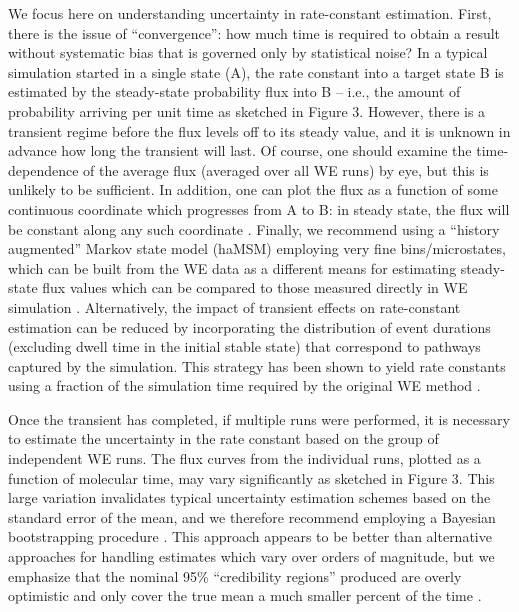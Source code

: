 \documentclass[9pt,tutorial,ASAPversion]{livecoms}
\begin{document}
We focus here on understanding uncertainty in rate-constant estimation. 
First, there is the issue of “convergence”: how much time is required to obtain a result without systematic bias that is governed only by statistical noise? 
In a typical simulation started in a single state (A), the rate constant into a target state B is estimated by the steady-state probability flux into B -- i.e., the amount of probability arriving per unit time as sketched in Figure 3. 
However, there is a transient regime before the flux levels off to its steady value, and it is unknown in advance how long the transient will last. 
Of course, one should examine the time-dependence of the average flux (averaged over all WE runs) by eye, but this is unlikely to be sufficient. 
In addition, one can plot the flux as a function of some continuous coordinate which progresses from A to B: in steady state, the flux will be constant along any such coordinate \citep{Jeremy2019}.
Finally, we recommend using a “history augmented” Markov state model (haMSM) employing very fine bins/microstates, which can be built from the WE data as a different means for estimating steady-state flux values which can be compared to those measured directly in WE simulation \citep{Jeremy2019}. 
Alternatively, the impact of transient effects on rate-constant estimation can be reduced by incorporating the distribution of event durations (excluding dwell time in the initial stable state) that correspond to pathways captured by the simulation. 
This strategy has been shown to yield rate constants using a fraction of the simulation time required by the original WE method \citep{DeGrave2019}. 

Once the transient has completed, if multiple runs were performed, it is necessary to estimate the uncertainty in the rate constant based on the group of independent WE runs. 
The flux curves from the individual runs, plotted as a function of molecular time, may vary significantly as sketched in Figure 3. 
This large variation invalidates typical uncertainty estimation schemes based on the standard error of the mean, and we therefore recommend employing a Bayesian bootstrapping procedure \citep{MostofianJCTC2019}. 
This approach appears to be better than alternative approaches for handling estimates which vary over orders of magnitude, but we emphasize that the nominal 95\% “credibility regions” produced are overly optimistic and only cover the true mean a much smaller percent of the time \citep{MostofianJCTC2019}.
\end{document}
